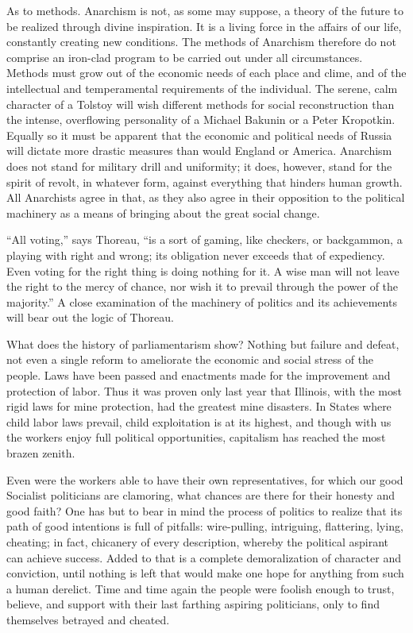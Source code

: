 As to methods. Anarchism is not, as some may suppose, a theory of the
future to be realized through divine inspiration. It is a living force
in the affairs of our life, constantly creating new conditions. The
methods of Anarchism therefore do not comprise an iron-clad program to
be carried out under all circumstances. Methods must grow out of the
economic needs of each place and clime, and of the intellectual and
temperamental requirements of the individual. The serene, calm
character of a Tolstoy will wish different methods for social
reconstruction than the intense, overflowing personality of a Michael
Bakunin or a Peter Kropotkin. Equally so it must be apparent that the
economic and political needs of Russia will dictate more drastic
measures than would England or America. Anarchism does not stand for
military drill and uniformity; it does, however, stand for the spirit
of revolt, in whatever form, against everything that hinders human
growth. All Anarchists agree in that, as they also agree in their
opposition to the political machinery as a means of bringing about the
great social change.

``All voting,'' says Thoreau, ``is a sort of gaming, like checkers, or
backgammon, a playing with right and wrong; its obligation never
exceeds that of expediency. Even voting for the right thing is doing
nothing for it. A wise man will not leave  the right to the
mercy of chance, nor wish it to prevail through the power of the
majority.'' A close examination of the machinery of politics and its
achievements will bear out the logic of Thoreau.

What does the history of parliamentarism show? Nothing but failure and
defeat, not even a single reform to ameliorate the economic and social
stress of the people. Laws have been passed and enactments made for
the improvement and protection of labor. Thus it was proven only last
year that Illinois, with the most rigid laws for mine protection, had
the greatest mine disasters. In States where child labor laws prevail,
child exploitation is at its highest, and though with us the workers
enjoy full political opportunities, capitalism has reached the most
brazen zenith.

Even were the workers able to have their own representatives, for
which our good Socialist politicians are clamoring, what chances are
there for their honesty and good faith? One has but to bear in mind
the process of politics to realize that its path of good intentions is
full of pitfalls: wire-pulling, intriguing, flattering, lying,
cheating; in fact, chicanery of every description, whereby the
political aspirant can achieve success. Added to that is a complete
demoralization of character and conviction, until nothing is left that
would make one hope for anything from such a human derelict. Time and
time again the people were foolish enough to trust, believe, and
support with their last farthing aspiring politicians, only to find
themselves betrayed and cheated.

